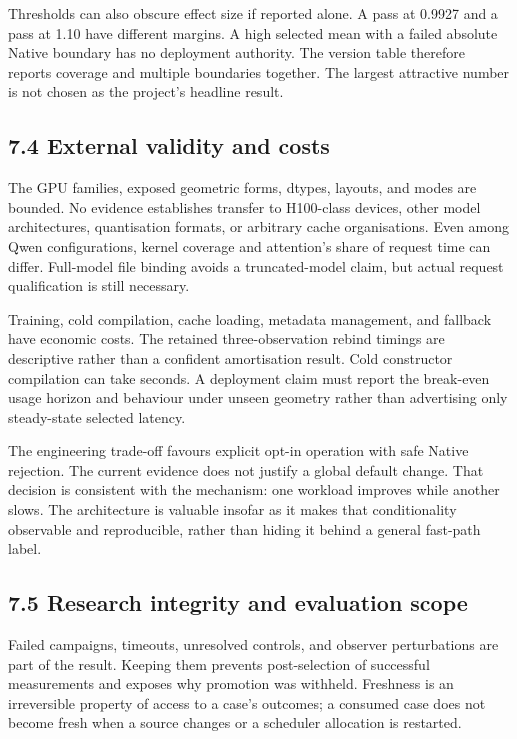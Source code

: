 \documentclass[11pt,a4paper]{article}
\begin{document}
Thresholds can also obscure effect size if reported alone. A pass at 0.9927 and a pass at 1.10 have different margins. A high selected mean with a failed absolute Native boundary has no deployment authority. The version table therefore reports coverage and multiple boundaries together. The largest attractive number is not chosen as the project's headline result.


\subsection*{7.4 External validity and costs}

The GPU families, exposed geometric forms, dtypes, layouts, and modes are bounded. No evidence establishes transfer to H100-class devices, other model architectures, quantisation formats, or arbitrary cache organisations. Even among Qwen configurations, kernel coverage and attention's share of request time can differ. Full-model file binding avoids a truncated-model claim, but actual request qualification is still necessary.


Training, cold compilation, cache loading, metadata management, and fallback have economic costs. The retained three-observation rebind timings are descriptive rather than a confident amortisation result. Cold constructor compilation can take seconds. A deployment claim must report the break-even usage horizon and behaviour under unseen geometry rather than advertising only steady-state selected latency.


The engineering trade-off favours explicit opt-in operation with safe Native rejection. The current evidence does not justify a global default change. That decision is consistent with the mechanism: one workload improves while another slows. The architecture is valuable insofar as it makes that conditionality observable and reproducible, rather than hiding it behind a general fast-path label.


\subsection*{7.5 Research integrity and evaluation scope}

Failed campaigns, timeouts, unresolved controls, and observer perturbations are part of the result. Keeping them prevents post-selection of successful measurements and exposes why promotion was withheld. Freshness is an irreversible property of access to a case's outcomes; a consumed case does not become fresh when a source changes or a scheduler allocation is restarted.
\end{document}

